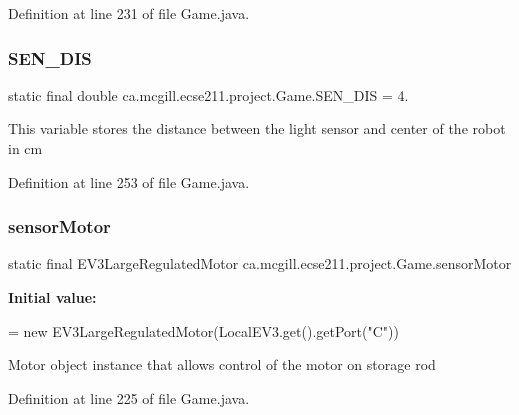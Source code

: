 Definition at line 231 of file Game.\+java.

\mbox{\label{enumca_1_1mcgill_1_1ecse211_1_1project_1_1_game_ab940d1a52b9759294dc0229e0fd6bc06}} 
\subsubsection{\texorpdfstring{S\+E\+N\+\_\+\+D\+IS}{SEN\_DIS}}
{\footnotesize\ttfamily  static  final double ca.\+mcgill.\+ecse211.\+project.\+Game.\+S\+E\+N\+\_\+\+D\+IS = 4.\hspace{0.3cm}{\ttfamily [static]}}

This variable stores the distance between the light sensor and center of the robot in cm 

Definition at line 253 of file Game.\+java.

\mbox{\label{enumca_1_1mcgill_1_1ecse211_1_1project_1_1_game_aa94b85dc88de85d959677bd6c0f98989}} 
\subsubsection{\texorpdfstring{sensor\+Motor}{sensorMotor}}
{\footnotesize\ttfamily  static  final E\+V3\+Large\+Regulated\+Motor ca.\+mcgill.\+ecse211.\+project.\+Game.\+sensor\+Motor\hspace{0.3cm}{\ttfamily [static]}}

{\bfseries Initial value\+:}
\begin{DoxyCode}
=
      \textcolor{keyword}{new} EV3LargeRegulatedMotor(LocalEV3.get().getPort(\textcolor{stringliteral}{"C"}))
\end{DoxyCode}
Motor object instance that allows control of the motor on storage rod 

Definition at line 225 of file Game.\+java.

